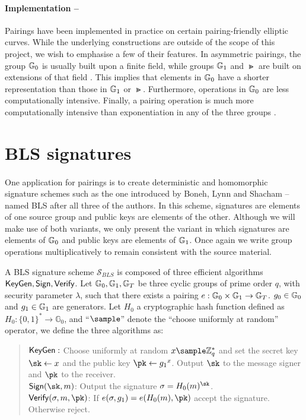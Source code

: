 \paragraph{Implementation --} Pairings have been implemented in practice on certain pairing-friendly elliptic curves. While the underlying constructions are outside of the scope of this project, we wish to emphasise a few of their features. In asymmetric pairings, the group $\mathbb{G}_0$ is usually built upon a finite field, while groups $\mathbb{G}_1$ and $\Gt$ are built on extensions of that field \cite{BonehShoup}. This implies that elements in $\mathbb{G}_0$ have a shorter representation than those in $\mathbb{G}_1$ or $\Gt$. Furthermore, operations in $\mathbb{G}_0$ are less computationally intensive. Finally, a pairing operation is much more computationally intensive than exponentiation in any of the three groups \cite{BonehShoup}.

\section{BLS signatures}

\paragraph{} One application for pairings is to create deterministic and homomorphic signature schemes such as the one introduced by Boneh, Lynn and Shacham \cite{BLS} -- named BLS after all three of the authors. In this scheme, signatures are elements of one source group and public keys are elements of the other. Although we will make use of both variants, we only present the variant in which signatures are elements of $\mathbb{G}_0$ and public keys are elements of $\mathbb{G}_1$. Once again we write group operations multiplicatively to remain consistent with the source material.


\begin{definition}
	A BLS signature scheme $\mathcal{S}_{BLS}$ is composed of three efficient algorithms $\mathsf{KeyGen}, \mathsf{Sign}, \mathsf{Verify}$. Let $\mathbb{G}_0, \mathbb{G}_1, \mathbb{G}_T$ be three cyclic groups of prime order $q$, with security parameter $\lambda$, such that there exists a pairing $e : \mathbb{G}_0 \times \mathbb{G}_1 \rightarrow \mathbb{G}_T$. $g_0 \in \mathbb{G}_0$ and $g_1 \in \mathbb{G}_1$ are generators. Let $H_0$ a cryptographic hash function defined as $H_0: \{0,1\}^* \rightarrow \mathbb{G}_0$, and ``$\sample$'' denote the ``choose uniformly at random'' operator, we define the three algorithms as:
	\begin{quote}
		$\mathsf{KeyGen}:$ Choose uniformly at random $x \sample \mathbb{Z}_q^* $ and set the secret key $\sk \leftarrow x$ and the public key $\pk \leftarrow {g_1}^x$. Output $\sk$ to the message signer and $\pk$ to the receiver. \\
		$\Sign(\sk, m)$: Output the signature $\sigma = H_0(m)^\sk$. \\
		$\Verif(\sigma, m, \pk)$: If $e(\sigma, g_1) = e(H_0(m), \pk)$ accept the signature. Otherwise reject.
	\end{quote}

\end{definition} 

